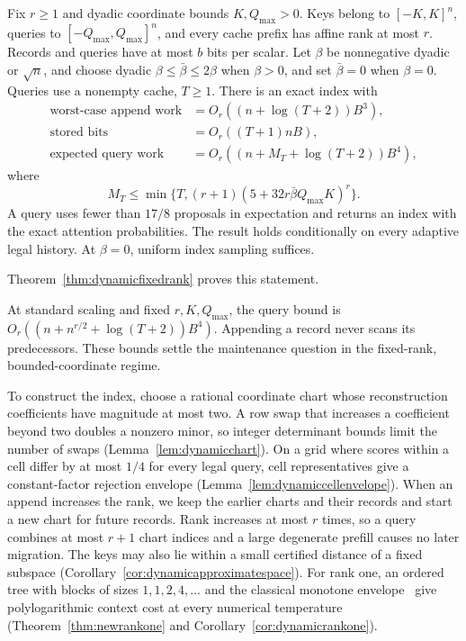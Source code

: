 \begin{theorem}
\label{thm:main-fixed-rank}
\label{thm:main-dynamic}
Fix $r\ge1$ and dyadic coordinate bounds $K,Q_{\max}>0$. Keys belong
to $[-K,K]^n$, queries to $[-Q_{\max},Q_{\max}]^n$, and every cache prefix
has affine rank at most $r$. Records and queries have at most
$b$ bits per scalar. Let $\beta$ be nonnegative dyadic or
$\sqrt n$, and choose dyadic $\beta\le\bar\beta\le2\beta$
when $\beta>0$, and set $\bar\beta=0$ when $\beta=0$.
Queries use a nonempty cache, $T\ge1$. There is an exact index with
\[
\begin{aligned}
 \text{worst-case append work}&=O_r((n+\log(T+2))B^3),\\
 \text{stored bits}&=O_r((T+1)nB),\\
 \text{expected query work}&=O_r((n+M_T+\log(T+2))B^4),
\end{aligned}
\]
where
\[
 M_T\le\min\{T,(r+1)(5+32r\bar\beta Q_{\max}K)^r\}.
\]
A query uses fewer than $17/8$ proposals in expectation and
returns an index with the exact attention probabilities.
The result holds conditionally on every adaptive legal history.
At $\beta=0$, uniform index sampling suffices.
\end{theorem}

Theorem~\ref{thm:dynamicfixedrank} proves this statement.

At standard scaling and fixed $r,K,Q_{\max}$, the query bound is
$O_r((n+n^{r/2}+\log(T+2))B^4)$. Appending a record never
scans its predecessors. These bounds settle the maintenance
question in the fixed-rank, bounded-coordinate regime.

To construct the index, choose a rational coordinate chart whose
reconstruction coefficients have magnitude at most two. A row swap
that increases a coefficient beyond two doubles a nonzero minor, so
integer determinant bounds limit the number of swaps
(Lemma~\ref{lem:dynamicchart}).
On a grid where scores within a cell differ by at most $1/4$ for every
legal query, cell representatives give a constant-factor rejection
envelope (Lemma~\ref{lem:dynamiccellenvelope}). When an append
increases the rank, we keep the earlier charts and their records and
start a new chart for future records. Rank increases at most $r$
times, so a query combines at most $r+1$ chart indices and a large
degenerate prefill causes no later migration. The keys may also lie
within a small certified distance of a fixed subspace
(Corollary~\ref{cor:dynamicapproximatespace}). For rank one, an ordered
tree with blocks of sizes $1,1,2,4,\ldots$ and the classical monotone
envelope~\cite{chewi2022} give polylogarithmic context cost at every
numerical temperature (Theorem~\ref{thm:newrankone} and
Corollary~\ref{cor:dynamicrankone}).

